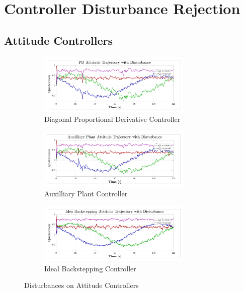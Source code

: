 \section{Controller Disturbance Rejection}
\label{app:disturbance}
\subsection{Attitude Controllers}
\label{app:disturbance.attitude}
\begin{figure}[htbp]
\centering
\begin{subfigure}{\textwidth}
\vspace{-12pt}
\centering
\includegraphics[width=0.8\textwidth]{graphs/PD_Diagonal_Trajectory_dist}
\vspace{-12pt}
\caption{Diagonal Proportional Derivative Controller}
\label{fig:app-attitude-pd-dist}
\end{subfigure}
\begin{subfigure}{\textwidth}
\vspace{-3pt}
\centering
\includegraphics[width=0.8\textwidth]{graphs/XPD_Trajectory_dist}
\vspace{-12pt}
\caption{Auxilliary Plant Controller}
\label{fig:app-attitude-xpd-dist}
\end{subfigure}
\begin{subfigure}{\textwidth}
\vspace{-3pt}
\centering
\includegraphics[width=0.8\textwidth]{graphs/IBC_Trajectory_dist}
\vspace{-10pt}
\caption{Ideal Backstepping Controller}
\label{fig:app-attitude-ibc-dist}
\end{subfigure}
\vspace{-3pt}
\caption{Disturbances on Attitude Controllers}
\end{figure}
\newpage
